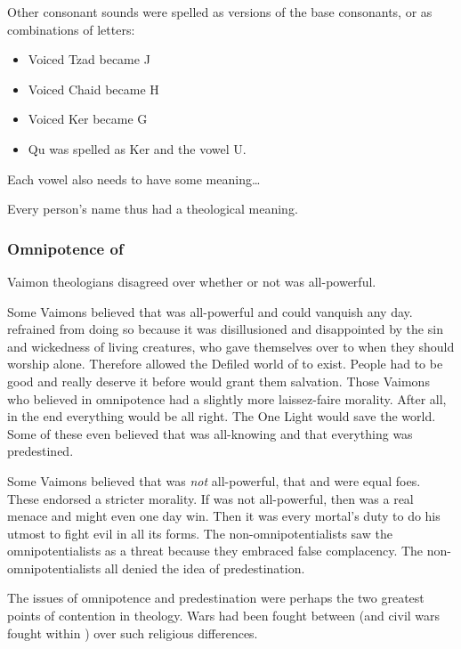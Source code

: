 Other consonant sounds were spelled as  versions of the base consonants, or as combinations of letters:
\begin{itemize}
  \item Voiced Tzad became J
  \item Voiced Chaid became H
  \item Voiced Ker became G
  \item Qu was spelled as Ker and the vowel U.
\end{itemize}


Each vowel also needs to have some meaning\ldots{}

Every person's name thus had a theological meaning. 





\subsubsection{Omnipotence of \Iquin}
Vaimon theologians disagreed over whether or not \iquin was all-powerful. 

Some Vaimons believed that \Iquin was all-powerful and could vanquish \itzach any day. 
\Iquin refrained from doing so because it was disillusioned and disappointed by the sin and wickedness of living creatures, who gave themselves over to \itzach when they should worship \iquin alone. 
Therefore \iquin allowed the Defiled world of \Gehinnom to exist.
People had to be good and really deserve it before \iquin would grant them salvation.
Those Vaimons who believed in omnipotence had a slightly more laissez-faire morality.
After all, in the end everything would be all right. 
The One Light would save the world. 
Some of these even believed that \iquin was all-knowing and that everything was predestined. 

Some Vaimons believed that \Iquin was \emph{not} all-powerful, that \iquin and \itzach were equal foes. 
These endorsed a stricter morality.
If \iquin was not all-powerful, then \itzach was a real menace and might even one day win.
Then it was every mortal's duty to do his utmost to fight evil in all its forms. 
The non-omnipotentialists saw the omnipotentialists as a threat because they embraced false complacency. 
The non-omnipotentialists all denied the idea of predestination. 

The issues of omnipotence and predestination were perhaps the two greatest points of contention in \iquinian theology.
Wars had been fought between \vclans (and civil wars fought within \vclans) over such religious differences.

